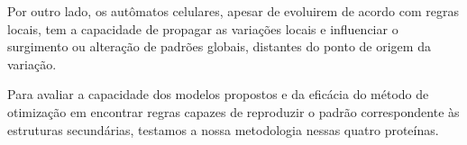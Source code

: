 Por outro lado, os autômatos celulares, apesar de evoluirem de acordo com regras locais, tem a capacidade de propagar as variações locais e influenciar o surgimento ou alteração de padrões globais, distantes do ponto de origem da variação. 

Para avaliar a capacidade dos modelos propostos e da eficácia do método de otimização em encontrar regras capazes de reproduzir o padrão correspondente às estruturas secundárias, testamos a nossa metodologia nessas quatro proteínas.
